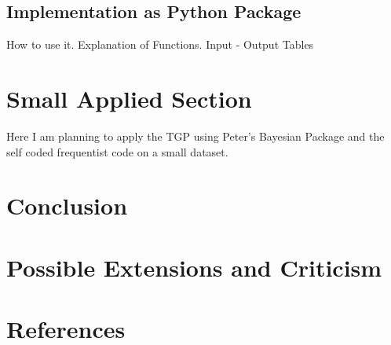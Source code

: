\documentclass[12pt,a4paper]{article}
\begin{document}
\subsection{Implementation as Python Package}

How to use it. 
Explanation of Functions. Input - Output Tables

\section{Small Applied Section}
Here I am planning to apply the TGP using Peter's Bayesian Package and the self coded frequentist code on a small dataset.
\section{Conclusion}
\section{Possible Extensions and Criticism}
\section{References}

\pagebreak
{}
\setcounter{page}{\thesavepage}
\pagestyle{plain}
%
%
\printbibliography[]
\clearpage
\appendix
\end{document}

